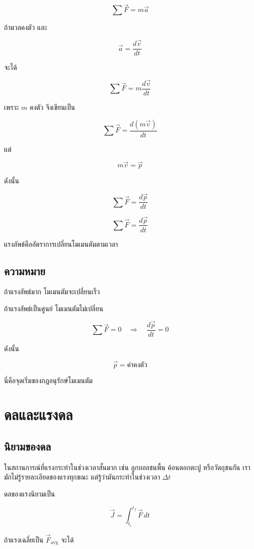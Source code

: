 \[
\sum \vec{F}=m\vec{a}
\]

ถ้ามวลคงตัว และ

\[
\vec{a}=\frac{d\vec{v}}{dt}
\]

จะได้

\[
\sum \vec{F}=m\frac{d\vec{v}}{dt}
\]

เพราะ $m$ คงตัว จึงเขียนเป็น

\[
\sum \vec{F}=\frac{d(m\vec{v})}{dt}
\]

แต่

\[
m\vec{v}=\vec{p}
\]

ดังนั้น

\[
\sum \vec{F}=\frac{d\vec{p}}{dt}
\]

\begin{tcolorbox}[title=กฎข้อที่สองในรูปโมเมนตัม]
\[
\sum \vec{F}=\frac{d\vec{p}}{dt}
\]

แรงลัพธ์คืออัตราการเปลี่ยนโมเมนตัมตามเวลา
\end{tcolorbox}

\subsection{ความหมาย}

ถ้าแรงลัพธ์มาก โมเมนตัมจะเปลี่ยนเร็ว

ถ้าแรงลัพธ์เป็นศูนย์ โมเมนตัมไม่เปลี่ยน

\[
\sum \vec{F}=0
\quad \Rightarrow \quad
\frac{d\vec{p}}{dt}=0
\]

ดังนั้น

\[
\vec{p}=\text{ค่าคงตัว}
\]

นี่คือจุดเริ่มของกฎอนุรักษ์โมเมนตัม

\section{ดลและแรงดล}

\subsection{นิยามของดล}

ในสถานการณ์ที่แรงกระทำในช่วงเวลาสั้นมาก เช่น ลูกบอลชนพื้น ค้อนตอกตะปู หรือวัตถุชนกัน เรามักไม่รู้รายละเอียดของแรงทุกขณะ แต่รู้ว่ามันกระทำในช่วงเวลา $\Delta t$

ดลของแรงนิยามเป็น

\[
\vec{J}=\int_{t_i}^{t_f}\vec{F}\,dt
\]

ถ้าแรงเฉลี่ยเป็น $\vec{F}_{\text{avg}}$ จะได้

